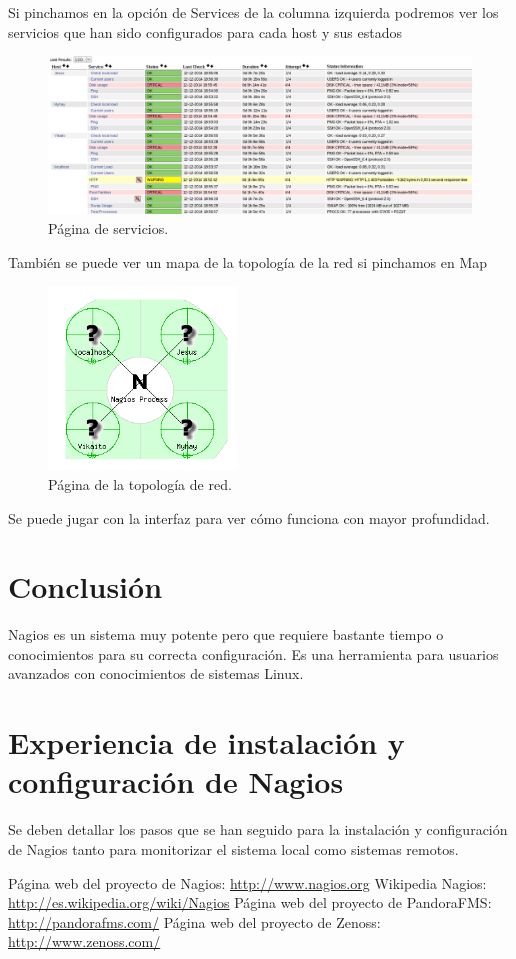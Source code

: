 \documentclass[11pt,a4paper]{article}
\begin{document}
\newpage
Si pinchamos en la opción de Services de la columna izquierda podremos ver los servicios que han sido configurados para cada host y sus estados

\begin{figure}[H]
  \centering
\includegraphics[width=12cm]{images/8.png} 
  \caption{Página de servicios.}
\end{figure}

También se puede ver un mapa de la topología de la red si pinchamos en Map

\begin{figure}[H]
  \centering
\includegraphics[width=5cm]{images/3.png} 
  \caption{Página de la topología de red.}
\end{figure}

Se puede jugar con la interfaz para ver cómo funciona con mayor profundidad.

\section{Conclusión}

Nagios es un sistema muy potente pero que requiere bastante tiempo o conocimientos para su correcta configuración. Es una herramienta para usuarios avanzados con conocimientos de sistemas Linux.

\section{Experiencia de instalación y configuración de Nagios}

Se deben detallar los pasos que se han seguido para la instalación y configuración de Nagios
tanto para monitorizar el sistema local como sistemas remotos.

\begin{thebibliography}{1}

 Página web del proyecto de Nagios: \url{http://www.nagios.org}
 Wikipedia Nagios: \url{http://es.wikipedia.org/wiki/Nagios}
 Página web del proyecto de PandoraFMS: \url{http://pandorafms.com/}
 Página web del proyecto de Zenoss: \url{http://www.zenoss.com/}
\end{thebibliography}
\end{document}
